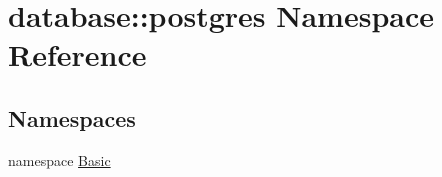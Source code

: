 \hypertarget{namespacedatabase_1_1postgres}{
\section{database::postgres Namespace Reference}
\label{namespacedatabase_1_1postgres}
}
\subsection*{Namespaces}
\begin{DoxyCompactItemize}
\item 
namespace \hyperlink{namespacedatabase_1_1postgres_1_1Basic}{Basic}
\end{DoxyCompactItemize}
